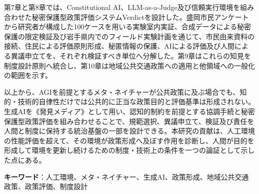第7章と第8章では、Constitutional AI、LLM-as-a-Judge及び信頼実行環境を組み合わせた秘密保護型政策評価システムVerdictを設計した。盛岡市民アンケートから研究者が構成した100ケースを用いる実験室内実証、合成データによる秘密保護の限定検証及び岩手県内でのフィールド実験計画を通じて、市民由来資料の接続、住民による評価原則形成、秘匿情報の保護、AIによる評価及び人間による異議申立てを、それぞれ検証すべき単位へ分解した。第9章はこれらの知見を制度設計原則へ統合し、第10章は地域公共交通政策への適用と他領域への一般化の範囲を示す。

以上から、AGIを前提とするメタ・ネイチャーが公共政策に及ぶ場合でも、知的・技術的自律性だけでは公共的に正当な政策目的と評価基準は形成されない。生成AIを《発見メディア》として用い、認知的制約を前提とする協調手続と秘密保護型政策評価を組み合わせることで、規範選択、異議申立て、検証及び責任を人間と制度に保持する統治基盤の一部を設計できる。本研究の貢献は、人工環境の性能評価を超えて、その環境が政策形成へ及ぼす作用を診断し、人間が目的を形成して環境を更新し続けるための制度・技術上の条件を一つの論証として示した点にある。

\vspace{1cm}
\noindent
\textbf{キーワード}：人工環境、メタ・ネイチャー、生成AI、政策形成、地域公共交通政策、政策評価、制度設計

